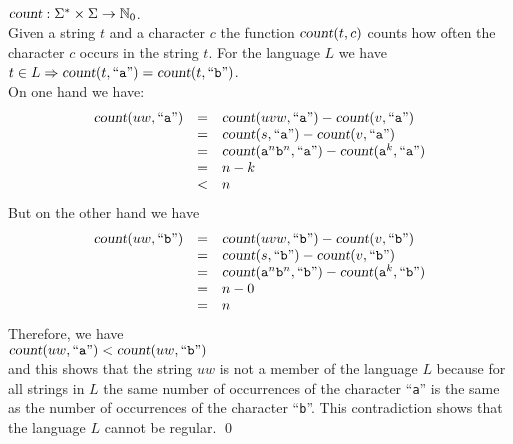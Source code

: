 \\[0.2cm]
\hspace*{1.3cm}
$\textsl{count}: \Sigma^* \times \Sigma \rightarrow \mathbb{N}_0$.
\\[0.2cm]
Given a  string $t$ and a character $c$ the function $\textsl{count}(t,c)$ counts how often the
character $c$ occurs in the string $t$.  For the language  $L$ we have
\\[0.2cm]
\hspace*{1.3cm}
$t \in L \Rightarrow \textsl{count}(t,\mbox{``\texttt{a}''}) = \textsl{count}(t, \mbox{``\texttt{b}''})$. 
\\[0.2cm]
On one hand we have:
\[  
\begin{array}{lcl}
\textsl{count}(uw,\mbox{``\texttt{a}''}) & = & \textsl{count}(uvw,\mbox{``\texttt{a}''}) - \textsl{count}(v,\mbox{``\texttt{a}''}) \\
 & = & \textsl{count}(s,\mbox{``\texttt{a}''}) - \textsl{count}(v,\mbox{``\texttt{a}''}) \\
 & = & \textsl{count}(\mathtt{a}^n\mathtt{b}^n,\mbox{``\texttt{a}''}) - \textsl{count}(\mathtt{a}^k,\mbox{``\texttt{a}''}) \\
 & = & n - k  \\
 & < & n   \\
\end{array}
\]
But on the other hand we have
\[  
\begin{array}{lcl}
\textsl{count}(uw,\mbox{``\texttt{b}''}) & = & \textsl{count}(uvw,\mbox{``\texttt{b}''}) - \textsl{count}(v,\mbox{``\texttt{b}''}) \\
                               & = & \textsl{count}(s,\mbox{``\texttt{b}''}) - \textsl{count}(v,\mbox{``\texttt{b}''}) \\
 & = & \textsl{count}(\mathtt{a}^n\mathtt{b}^n,\mbox{``\texttt{b}''}) - \textsl{count}(\mathtt{a}^k,\mbox{``\texttt{b}''}) \\
                               & = & n  - 0\\
                               & = & n  
\end{array}
\]
Therefore, we have
\\[0.2cm]
\hspace*{1.3cm}
$\textsl{count}(uw,\mbox{``\texttt{a}''}) < \textsl{count}(uw,\mbox{``\texttt{b}''})$
\\[0.2cm]
and this shows that the string $uw$ is not a member of the language $L$ because for all strings in $L$ 
the same number of occurrences of the character ``\texttt{a}'' is the same as the number of
occurrences of the character ``\texttt{b}''.  This contradiction shows that the language $L$ cannot
be regular.
\qed

